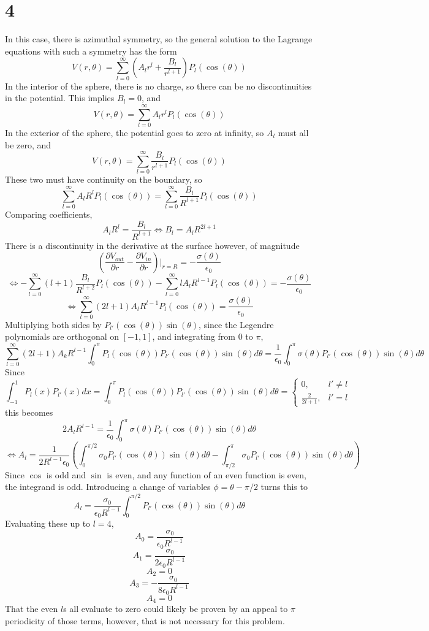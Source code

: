 \documentclass{article}
\begin{document}
\section*{4}
In this case, there is azimuthal symmetry, so the general solution to the Lagrange equations with such a symmetry has the form
\[V(r,\theta)=\sum_{l=0}^\infty\left( A_lr^l+\frac{B_l}{r^{l+1}} \right)P_l(\cos(\theta))\]
In the interior of the sphere, there is no charge, so there can be no discontinuities in the potential. This implies $B_l=0$, and
\[V(r,\theta)=\sum_{l=0}^\infty A_lr^lP_l(\cos(\theta))\]
In the exterior of the sphere, the potential goes to zero at infinity, so $A_l$ must all be zero, and
\[V(r,\theta)=\sum_{l=0}^\infty \frac{B_l}{r^{l+1}}P_l(\cos(\theta))\]
These two must have continuity on the boundary, so
\[\sum_{l=0}^\infty A_lR^lP_l(\cos(\theta))=\sum_{l=0}^\infty \frac{B_l}{R^{l+1}}P_l(\cos(\theta))\]
Comparing coefficients,
\[A_lR^l=\frac{B_l}{R^{l+1}}\Leftrightarrow {B_l}=A_lR^{2l+1}\]
There is a discontinuity in the derivative at the surface however, of magnitude
\[\left( \frac{\partial V_{out}}{\partial r}-\frac{\partial V_{in}}{\partial r}\right)\bigg|_{r=R}=-\frac{\sigma(\theta)}{\epsilon_0}\]
\[\Leftrightarrow-\sum_{l=0}^\infty (l+1)\frac{B_l}{R^{l+2}}P_l(\cos(\theta))-\sum_{l=0}^\infty lA_lR^{l-1}P_l(\cos(\theta))=-\frac{\sigma(\theta)}{\epsilon_0}\]
\[\Leftrightarrow \sum_{l=0}^\infty (2l+1)A_lR^{l-1}P_l(\cos(\theta))=\frac{\sigma(\theta)}{\epsilon_0}\]
Multiplying both sides by $P_{l'}(\cos(\theta))\sin(\theta)$, since the Legendre polynomials are orthogonal on $[-1,1]$, and integrating from $0$ to $\pi$,
\[\sum_{l=0}^\infty(2l+1)A_kR^{l-1}\int_0^\pi P_l(\cos(\theta))P_{l'}(\cos(\theta))\sin(\theta)d\theta=\frac{1}{\epsilon_0}\int_0^\pi\sigma(\theta)P_{l'}(\cos(\theta))\sin(\theta) d\theta\]
Since
\[\int_{-1}^1P_l(x)P_{l'}(x)dx=\int_0^\pi P_l(\cos(\theta))P_{l'}(\cos(\theta))\sin(\theta)d\theta=\begin{cases}
    0, & l'\neq l\\
    \frac{2}{2l+1}, & l'=l
  \end{cases}\]
this becomes
\[2A_lR^{l-1}=\frac{1}{\epsilon_0}\int_0^\pi\sigma(\theta)P_{l'}(\cos(\theta))\sin(\theta)d\theta\]
\[\Leftrightarrow A_l=\frac{1}{2R^{l-1}\epsilon_0}\left( \int_0^{\pi/2}\sigma_0P_{l'}(\cos(\theta))\sin(\theta)d\theta-\int_{\pi/2}^{\pi}\sigma_0P_{l'}(\cos(\theta))\sin(\theta)d\theta\right)\]
Since $\cos$ is odd and $\sin$ is even, and any function of an even function is even, the integrand is odd. Introducing a change of variables $\phi=\theta-\pi/2$ turns this to
\[A_l=\frac{\sigma_0}{\epsilon_0R^{l-1}}\int_0^{\pi/2}P_{l'}(\cos(\theta))\sin(\theta)d\theta\]
Evaluating these up to $l=4$,
\[A_0=\frac{\sigma_0}{\epsilon_0R^{l-1}}\]
\[A_1=\frac{\sigma_0}{2\epsilon_0R^{l-1}}\]
\[A_2= 0\]
\[A_3=-\frac{\sigma_0}{8\epsilon_0R^{l-1}}\]
\[A_4=0\]
That the even $l$s all evaluate to zero could likely be proven by an appeal to $\pi$ periodicity of those terms, however, that is not necessary for this problem.
\end{document}
